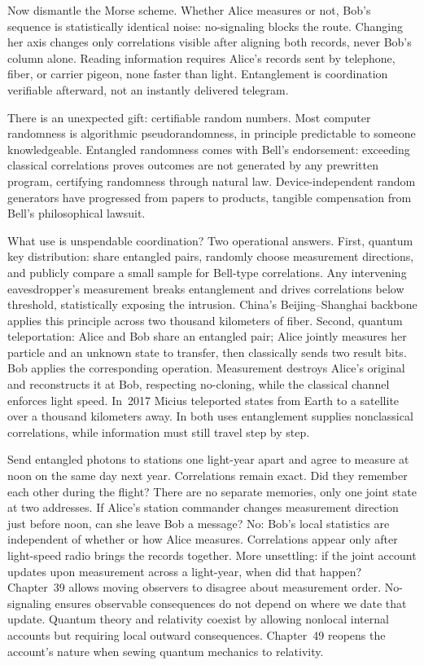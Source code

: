 Now dismantle the Morse scheme. Whether Alice measures or not, Bob's sequence is statistically identical noise: no-signaling blocks the route. Changing her axis changes only correlations visible after aligning both records, never Bob's column alone. Reading information requires Alice's records sent by telephone, fiber, or carrier pigeon, none faster than light. Entanglement is coordination verifiable afterward, not an instantly delivered telegram.

There is an unexpected gift: certifiable random numbers. Most computer randomness is algorithmic pseudorandomness, in principle predictable to someone knowledgeable. Entangled randomness comes with Bell's endorsement: exceeding classical correlations proves outcomes are not generated by any prewritten program, certifying randomness through natural law. Device-independent random generators have progressed from papers to products, tangible compensation from Bell's philosophical lawsuit.

What use is unspendable coordination? Two operational answers. First, quantum key distribution: share entangled pairs, randomly choose measurement directions, and publicly compare a small sample for Bell-type correlations. Any intervening eavesdropper's measurement breaks entanglement and drives correlations below threshold, statistically exposing the intrusion. China's Beijing--Shanghai backbone applies this principle across two thousand kilometers of fiber. Second, quantum teleportation: Alice and Bob share an entangled pair; Alice jointly measures her particle and an unknown state to transfer, then classically sends two result bits. Bob applies the corresponding operation. Measurement destroys Alice's original and reconstructs it at Bob, respecting no-cloning, while the classical channel enforces light speed. In~2017 Micius teleported states from Earth to a satellite over a thousand kilometers away. In both uses entanglement supplies nonclassical correlations, while information must still travel step by step.


\begin{thought}
Send entangled photons to stations one light-year apart and agree to measure at noon on the same day next year. Correlations remain exact. Did they remember each other during the flight? There are no separate memories, only one joint state at two addresses. If Alice's station commander changes measurement direction just before noon, can she leave Bob a message? No: Bob's local statistics are independent of whether or how Alice measures. Correlations appear only after light-speed radio brings the records together. More unsettling: if the joint account updates upon measurement across a light-year, when did that happen? Chapter~39 allows moving observers to disagree about measurement order. No-signaling ensures observable consequences do not depend on where we date that update. Quantum theory and relativity coexist by allowing nonlocal internal accounts but requiring local outward consequences. Chapter~49 reopens the account's nature when sewing quantum mechanics to relativity.
\end{thought}

